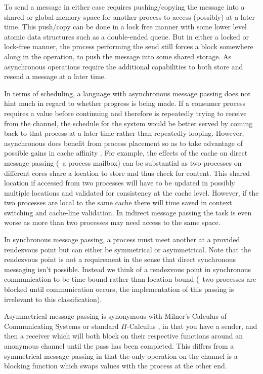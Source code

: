 To send a message in either case requires pushing/copying the 
message into a shared or global memory space for another process to access 
(possibly) at a later time. This push/copy can be done in a lock free manner 
with some lower level atomic data structures such as a double-ended queue. But 
in either a locked or lock-free manner, the process performing the send still 
forces a block somewhere along in the operation, to push the message into some
shared storage. As asynchronous operations require the additional capabilities 
to both store and resend a message at a later time.

In terms of scheduling, a language with asynchronous message passing does not 
hint much in regard to whether progress is being made. If a consumer process
requires a value before continuing and therefore is repeatedly trying to receive 
from the channel, the schedule for the system would be better served by coming 
back to that process at a later time rather than repeatedly looping. However,
asynchronous does benefit from process placement so as to take advantage of 
possible gains in cache affinity \cite{debattista2002cache}. For example, the 
effects of the cache on direct message passing (\eg~a process mailbox) can be 
substantial as two processes on different cores share a location to store and
thus check for content. This shared location if accessed from two processes
will have to be updated in possibly multiple locations and validated for 
consistency at the cache level. However, if the two processes are local to the 
same cache there will time saved in context switching and cache-line validation. 
In indirect message passing the task is even worse as more than two processes 
may need access to the same space.

In synchronous message passing, a process must meet another at a provided 
rendezvous point but can either be symmetrical or asymmetrical. Note that the 
rendezvous point is not a requirement in the sense that direct synchronous 
messaging isn't possible. Instead we think of a rendezvous point in synchronous 
communication to be time bound rather than location bound (\ie~two processes are 
blocked until communication occurs, the implementation of this passing is 
irrelevant to this classification).

Asymmetrical message passing is synonymous with Milner's Calculus of 
Communicating Systems \cite{milner1982calculus} or standard $\Pi$-Calculus 
\cite{palamidessi1997comparing}, in that you have a sender, and then a receiver 
which will both block on their respective functions around an anonymous channel 
until the pass has been completed. This differs from a symmetrical message 
passing in that the only operation on the channel is a blocking function which 
swaps values with the process at the other end.

